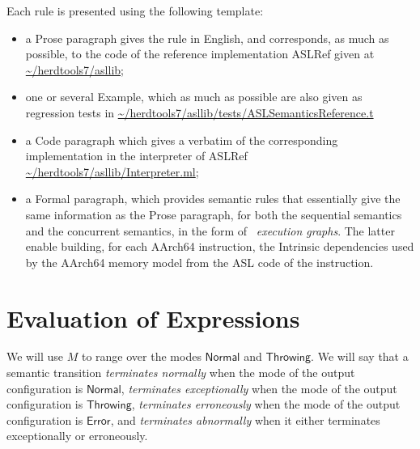 \documentclass{book}
\newcommand\Normal[0]{\textsf{Normal}}
\newcommand\Throwing[0]{\textsf{Throwing}}
\newcommand\Error[0]{\textsf{Error}}
\begin{document}
Each rule is presented using the following template:
\begin{itemize}
\item a Prose paragraph gives the rule in English, and corresponds, as much as possible, to the code of the reference implementation ASLRef given at
 \url{~/herdtools7/asllib};
\item one or several Example, which as much as possible are also given as regression tests in \url{~/herdtools7/asllib/tests/ASLSemanticsReference.t}
\item a Code paragraph which gives a verbatim of the corresponding implementation in the interpreter of ASLRef \url{~/herdtools7/asllib/Interpreter.ml};
\item a Formal paragraph, which provides semantic rules that essentially give the same information as the Prose paragraph, for both
the sequential semantics and the concurrent semantics, in the form of \herd\ \emph{execution graphs}.
The latter enable building, for each AArch64 instruction,
the Intrinsic dependencies used by the AArch64 memory model from the ASL code of the instruction.
\end{itemize}

\chapter{Evaluation of Expressions \label{chap:eval_expr}}

We will use $M$ to range over the modes $\Normal$ and $\Throwing$.
We will say that a semantic transition \emph{terminates normally} when the mode of the output configuration is $\Normal$,
\emph{terminates exceptionally} when the mode of the output configuration is $\Throwing$,
\emph{terminates erroneously} when the mode of the output configuration is $\Error$,
and \emph{terminates abnormally} when it either terminates exceptionally or erroneously.
\end{document}
